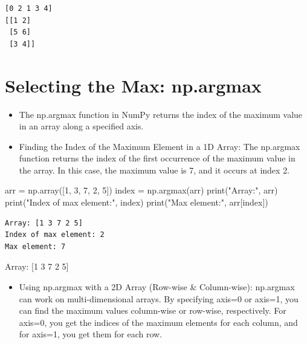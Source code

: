 \documentclass[
  letterpaper,
  DIV=11,
  numbers=noendperiod]{scrreprt}
\newenvironment{Shaded}{\begin{snugshade}}{\end{snugshade}}
\newcommand{\BuiltInTok}[1]{\textcolor[rgb]{0.00,0.23,0.31}{#1}}
\newcommand{\DecValTok}[1]{\textcolor[rgb]{0.68,0.00,0.00}{#1}}
\newcommand{\NormalTok}[1]{\textcolor[rgb]{0.00,0.23,0.31}{#1}}
\newcommand{\OperatorTok}[1]{\textcolor[rgb]{0.37,0.37,0.37}{#1}}
\newcommand{\StringTok}[1]{\textcolor[rgb]{0.13,0.47,0.30}{#1}}
\providecommand{\tightlist}{%
  \setlength{\itemsep}{0pt}\setlength{\parskip}{0pt}}\usepackage{longtable,booktabs,array}
\begin{document}
\begin{verbatim}
[0 2 1 3 4]
[[1 2]
 [5 6]
 [3 4]]
\end{verbatim}

\section{Selecting the Max:
np.argmax}\label{selecting-the-max-np.argmax}

\begin{itemize}
\tightlist
\item
  The np.argmax function in NumPy returns the index of the maximum value
  in an array along a specified axis.
\item
  Finding the Index of the Maximum Element in a 1D Array: The np.argmax
  function returns the index of the first occurrence of the maximum
  value in the array. In this case, the maximum value is 7, and it
  occurs at index 2.
\end{itemize}

\begin{Shaded}
\begin{Highlighting}[]
\NormalTok{arr }\OperatorTok{=}\NormalTok{ np.array([}\DecValTok{1}\NormalTok{, }\DecValTok{3}\NormalTok{, }\DecValTok{7}\NormalTok{, }\DecValTok{2}\NormalTok{, }\DecValTok{5}\NormalTok{])}
\NormalTok{index }\OperatorTok{=}\NormalTok{ np.argmax(arr)}
\BuiltInTok{print}\NormalTok{(}\StringTok{"Array:"}\NormalTok{, arr)}
\BuiltInTok{print}\NormalTok{(}\StringTok{"Index of max element:"}\NormalTok{, index)}
\BuiltInTok{print}\NormalTok{(}\StringTok{"Max element:"}\NormalTok{, arr[index])}
\end{Highlighting}
\end{Shaded}

\begin{verbatim}
Array: [1 3 7 2 5]
Index of max element: 2
Max element: 7
\end{verbatim}

Array: {[}1 3 7 2 5{]}

\begin{itemize}
\tightlist
\item
  Using np.argmax with a 2D Array (Row-wise \& Column-wise): np.argmax
  can work on multi-dimensional arrays. By specifying axis=0 or axis=1,
  you can find the maximum values column-wise or row-wise, respectively.
  For axis=0, you get the indices of the maximum elements for each
  column, and for axis=1, you get them for each row.
\end{itemize}
\end{document}
